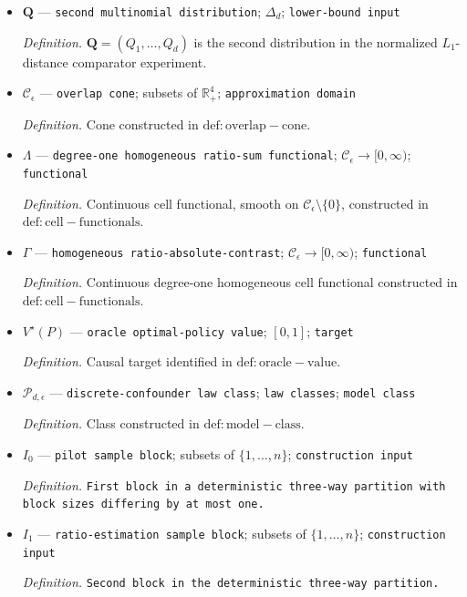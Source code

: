 \documentclass{article}
\begin{document}
\begin{itemize}
  \item \(\mathbf Q\) --- \texttt{second multinomial distribution}; \(\Delta_d\); \texttt{lower-\allowbreak{}bound input}
  \par\smallskip\noindent\emph{Definition.} \(\mathbf Q=(Q_1,\ldots,Q_d)\) is the second distribution in the normalized \(L_1\)-distance comparator experiment.
  \item \(\mathcal C_\epsilon\) --- \texttt{overlap cone}; subsets of \(\mathbb R_+^4\); \texttt{approximation domain}
  \par\smallskip\noindent\emph{Definition.} Cone constructed in \(\mathrm{def:overlap-cone}\).
  \item \(\Lambda\) --- \texttt{degree-\allowbreak{}one homogeneous ratio-\allowbreak{}sum functional}; \(\mathcal C_\epsilon\to[0,\infty)\); \texttt{functional}
  \par\smallskip\noindent\emph{Definition.} Continuous cell functional, smooth on \(\mathcal C_\epsilon\setminus\{0\}\), constructed in \(\mathrm{def:cell-functionals}\).
  \item \(\Gamma\) --- \texttt{homogeneous ratio-\allowbreak{}absolute-\allowbreak{}contrast}; \(\mathcal C_\epsilon\to[0,\infty)\); \texttt{functional}
  \par\smallskip\noindent\emph{Definition.} Continuous degree-one homogeneous cell functional constructed in \(\mathrm{def:cell-functionals}\).
  \item \(V^\star(P)\) --- \texttt{oracle optimal-\allowbreak{}policy value}; \([0,1]\); \texttt{target}
  \par\smallskip\noindent\emph{Definition.} Causal target identified in \(\mathrm{def:oracle-value}\).
  \item \(\mathcal P_{d,\epsilon}\) --- \texttt{discrete-\allowbreak{}confounder law class}; \texttt{law classes}; \texttt{model class}
  \par\smallskip\noindent\emph{Definition.} Class constructed in \(\mathrm{def:model-class}\).
  \item \(I_0\) --- \texttt{pilot sample block}; subsets of \(\{1,\ldots,n\}\); \texttt{construction input}
  \par\smallskip\noindent\emph{Definition.} \texttt{First block in a deterministic three-\allowbreak{}way partition with block sizes differing by at most one.}
  \item \(I_1\) --- \texttt{ratio-\allowbreak{}estimation sample block}; subsets of \(\{1,\ldots,n\}\); \texttt{construction input}
  \par\smallskip\noindent\emph{Definition.} \texttt{Second block in the deterministic three-\allowbreak{}way partition.}

\end{itemize}
\end{document}
